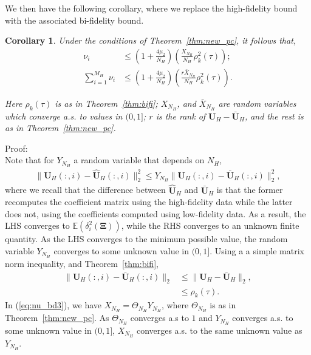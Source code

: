 \documentclass{report}
\newtheorem{cor}{Corollary}
\begin{document}
We then have the following corollary, where we replace the high-fidelity bound with the associated bi-fidelity bound.
\begin{cor}
Under the conditions of Theorem~\ref{thm:new_pc}, it follows that,
\begin{align}
 \label{eq:nu_bd3}
 \nu_i &\le \left(1+\frac{4\mu_2}{N_H}\right)\left(\frac{X_{N_H}}{N_H}\rho^2_k(\tau)\right);\\
 \label{eq:nu_bd4}
 \mathop{\sum}\limits_{i=1}^{M_H}\nu_i &\le \left(1+\frac{4\mu_2}{N_H}\right)\left(\frac{r\bar{X}_{N_H}}{N_H}\rho^2_k(\tau)\right).
\end{align}

Here $\rho_k(\tau)$ is as in Theorem~\ref{thm:bifi}; $X_{N_H}$, and $\bar{X}_{N_H}$ are random variables which converge a.s. to values in $(0,1]$; $r$ is the rank of $\bm{U}_H-\bar{\bm{U}}_H$, and the rest is as in Theorem~\ref{thm:new_pc}.
\end{cor}

Proof:\\
Note that for $Y_{N_H}$ a random variable that depends on $N_H$,
\begin{align}
\|\bm{U}_H(:,i)-\hat{\bm{U}}_H(:,i)\|_2^2 \le Y_{N_H}\|\bm{U}_H(:,i)-\bar{\bm{U}}_H(:,i)\|^2_2,
\label{eq:Y}
\end{align}
where we recall that the difference between $\hat{\bm{U}}_H$ and $\bar{\bm{U}}_H$ is that the former recomputes the coefficient matrix using the high-fidelity data while the latter does not, using the coefficients computed using low-fidelity data. As a result, the LHS converges to $\mathbb{E}(\delta^2_i(\bm{\Xi}))$, while the RHS converges to an unknown finite quantity. As the LHS converges to the minimum possible value, the random variable $Y_{N_H}$ converges to some unknown value in $(0,1]$. Using a a simple matrix norm inequality, and Theorem~\ref{thm:bifi},
\begin{align}
\|\bm{U}_H(:,i)-\bar{\bm{U}}_H(:,i)\|_2 &\le \|\bm{U}_H-\bar{\bm{U}}_H\|_2,\\
 &\le \rho_k(\tau).
\end{align}
In (\ref{eq:nu_bd3}), we have $X_{N_H} = \Theta_{N_H}Y_{N_H}$, where $\Theta_{N_H}$ is as in Theorem~\ref{thm:new_pc}. As $\Theta_{N_H}$ converges a.s to $1$ and $Y_{N_H}$ converges a.s. to some unknown value in $(0,1]$, $X_{N_H}$ converges a.s. to the same unknown value as $Y_{N_H}$.\\
\end{document}
